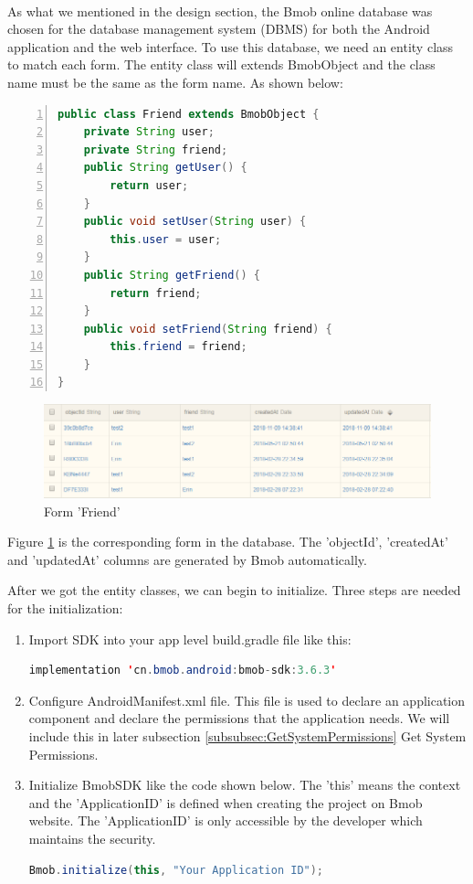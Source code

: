 \paragraph{}As what we mentioned in the design section, the Bmob online database was chosen for the database management system (DBMS) for both the Android application and the web interface. To use this database, we need an entity class to match each form. The entity class will extends BmobObject and the class name must be the same as the form name. As shown below:
\begin{lstlisting}[language={java},
        numbers=left,basicstyle=\small\ttfamily]
public class Friend extends BmobObject {
    private String user;
    private String friend;
    public String getUser() {
        return user;
    }
    public void setUser(String user) {
        this.user = user;
    }
    public String getFriend() {
        return friend;
    }
    public void setFriend(String friend) {
        this.friend = friend;
    }
}
\end{lstlisting} 
\begin{figure}[htb]
\centering
\includegraphics[width=.9\textwidth]{section04/assets/databaseOverview.png}
\caption[Short Caption]{\label{DatabseOverview}Form 'Friend'}
\end{figure}
\par Figure \ref{DatabseOverview} is the corresponding form in the database. The 'objectId', 'createdAt' and 'updatedAt' columns are generated by Bmob automatically. 
\par After we got the entity classes, we can begin to initialize. Three steps are needed for the initialization: 
\begin{enumerate}
\item[1)]Import SDK into your app level build.gradle file like this:
\begin{lstlisting}[language=JAVA] 
implementation 'cn.bmob.android:bmob-sdk:3.6.3'
\end{lstlisting} 
\item[2)] Configure AndroidManifest.xml file. This file is used to declare an application component and declare the permissions that the application needs. We will include this in later subsection \ref{subsubsec:GetSystemPermissions} Get System Permissions.
\item[3)] Initialize BmobSDK like the code shown below. The 'this' means the context and the 'ApplicationID' is defined when creating the project on Bmob website. The 'ApplicationID' is only accessible by the developer which maintains the security.
\begin{lstlisting}[language=JAVA] 
Bmob.initialize(this, "Your Application ID");
\end{lstlisting} 
\end{enumerate}
